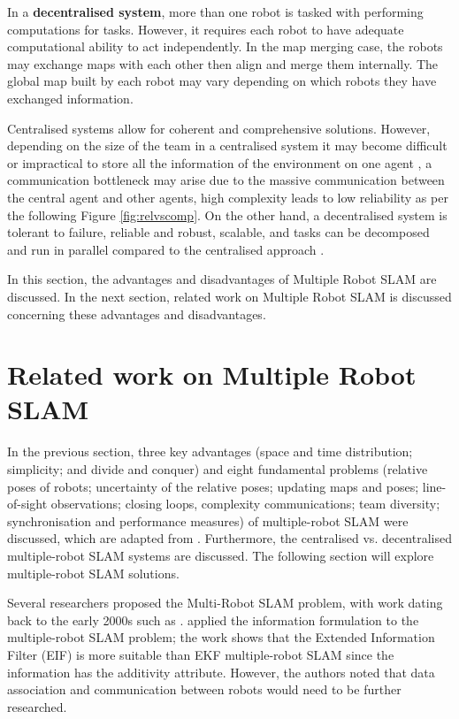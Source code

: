 In a \textbf{decentralised system}, more than one robot is tasked with performing computations for tasks. However, it requires each robot to have adequate computational ability to act independently. In the map merging case, the robots may exchange maps with each other then align and merge them internally. The global map built by each robot may vary depending on which robots they have exchanged information.

Centralised systems allow for coherent and comprehensive solutions. However, depending on the size of the team in a centralised system it may become difficult or impractical to store all the information of the environment on one agent \cite{Leung2010}, a communication bottleneck may arise due to the massive communication between the central agent and other agents, high complexity leads to low reliability as per the following Figure \ref{fig:relvscomp}. On the other hand, a decentralised system is tolerant to failure, reliable and robust, scalable, and tasks can be decomposed and run in parallel compared to the centralised approach \cite{Leung2010}.

In this section, the advantages and disadvantages of Multiple Robot SLAM are discussed. In the next section, related work on Multiple Robot SLAM is discussed concerning these advantages and disadvantages.

\section{Related work on Multiple Robot SLAM}
In the previous section, three key advantages (space and time distribution; simplicity; and divide and conquer) and eight fundamental problems (relative poses of robots; uncertainty of the relative poses; updating maps and poses; line-of-sight observations; closing loops, complexity communications; team diversity; synchronisation and performance measures) of multiple-robot SLAM were discussed, which are adapted from \cite{Saeedi}. Furthermore, the centralised vs. decentralised multiple-robot SLAM systems are discussed. The following section will explore multiple-robot SLAM solutions.

Several researchers proposed the Multi-Robot SLAM problem, with work dating back to the early 2000s such as \cite{Nettleton2000}. \cite{Nettleton2000} applied the information formulation to the multiple-robot SLAM problem; the work shows that the Extended Information Filter (EIF) is more suitable than EKF multiple-robot SLAM since the information has the additivity attribute. However, the authors noted that data association and communication between robots would need to be further researched.  

